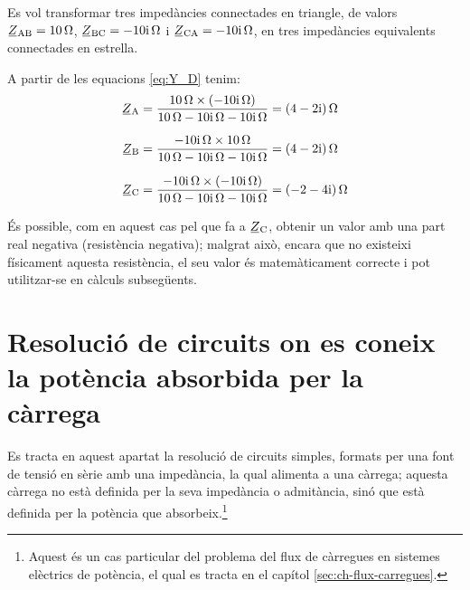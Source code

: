 \begin{center}
    
    \label{pic:Y_D}
\end{center}


	
\begin{exemple}\label{ex:TriangleEstrella}
	\addcontentsxms{\TriangleEstrella}
    Es vol transformar tres impedàncies connectades en triangle, de
    valors $ \cmplx{Z}\ped{AB}=\qty{10}{\ohm}$,
    $\cmplx{Z}\ped{BC}=\complexqty{-j10}{\ohm}$ i
    $\cmplx{Z}\ped{CA}=\complexqty{-j10}{\ohm}$, en tres impedàncies
    equivalents connectades en estrella.

    A partir de les equacions \eqref{eq:Y_D}  tenim:
    \begin{align*}
       \cmplx{Z}\ped{A} & = \frac{\qty{10}{\ohm}\times(\complexqty{-j10}{\ohm})}{\qty{10}{\ohm} - \complexqty{j10}{\ohm} - \complexqty{j10}{\ohm}} = \complexqty{4-j2}{\ohm} \\[1.5ex]
       \cmplx{Z}\ped{B} & = \frac{\complexqty{-j10}{\ohm}\times \qty{10}{\ohm}}{\qty{10}{\ohm} - \complexqty{j10}{\ohm} - \complexqty{j10}{\ohm}} = \complexqty{4-j2}{\ohm} \\[1.5ex]
    \cmplx{Z}\ped{C} &= \frac{\complexqty{-j10}{\ohm}\times(\complexqty{-j10}{\ohm})}{\qty{10}{\ohm} -
    \complexqty{j10}{\ohm} - \complexqty{j10}{\ohm}} = \complexqty{-2-j4}{\ohm}
    \end{align*}

    És possible, com en aquest cas pel que fa a $\cmplx{Z}\ped{C}$,
    obtenir un valor amb una part real negativa (resistència negativa);
    malgrat això, encara que no existeixi físicament aquesta resistència,
    el seu valor és matemàticament correcte i  pot utilitzar-se en
    càlculs subsegüents.
\end{exemple}



\section{Resolució de circuits on es coneix la potència absorbida per la
càrrega}\label{sec:EZS}

Es tracta en aquest apartat la resolució de circuits simples,
formats per una font de tensió en sèrie amb una impedància, la qual
alimenta a una càrrega; aquesta càrrega no està definida per la seva
impedància o admitància, sinó que està definida per la potència que absorbeix.\footnote{Aquest és un cas particular del problema del flux de càrregues en sistemes elèctrics de potència, el qual es tracta en el capítol \ref{sec:ch-flux-carregues}.}

